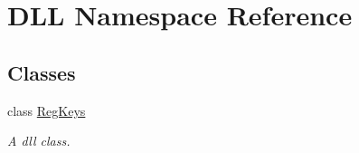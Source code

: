 \hypertarget{namespace_d_l_l}{}\section{D\+LL Namespace Reference}
\label{namespace_d_l_l}
\subsection*{Classes}
\begin{DoxyCompactItemize}
\item 
class \hyperlink{class_d_l_l_1_1_reg_keys}{Reg\+Keys}
\begin{DoxyCompactList}\small\item\em A dll class. \end{DoxyCompactList}\end{DoxyCompactItemize}
